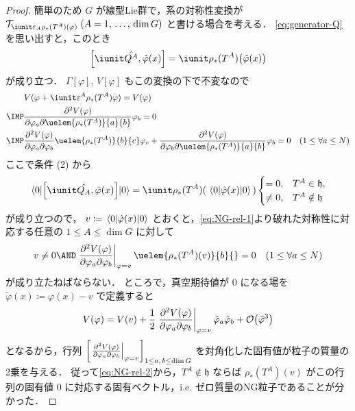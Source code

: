 \documentclass[TQFT_main]{subfiles}
\begin{document}
\begin{proof}
    簡単のため $G$ が線型Lie群で，系の対称性変換が $\mathcal{T}_{\iunit \varepsilon_A \rho_*(T^A)(\varphi)}\; (A = 1,\, \dots,\, \dim G)$ と書ける場合を考える．
    \eqref{eq:generator-Q}を思い出すと，このとき
    \begin{align}
        \comm{\iunit \hat{Q^A}}{\hat{\varphi}(x)} = \iunit \rho_*(T^A)\bigl(\hat{\varphi}(x)\bigr)
    \end{align}
    が成り立つ．    
    $\Gamma[\varphi],\, V[\varphi]$ もこの変換の下で不変なので
    \begin{align}
        &V(\varphi + \iunit \varepsilon^A \rho_*(T^A) \varphi) = V(\varphi) \\
        \IMP &\pdv{V(\varphi)}{\varphi_a} \uelem{\rho_*(T^A)}{a}{b} \varphi_b = 0 \\
        \IMP &\pdv[2]{V(\varphi)}{\varphi_a}{\varphi_b} \uelem{\rho_*(T^A)}{b}{c} \varphi_c + \pdv{V(\varphi)}{\varphi_b} \uelem{\rho_*(T^A)}{a}{b} \varphi_b = 0 \quad (1 \le \forall a \le N) \label{eq:NG-rel-1}
    \end{align}
    ここで条件 (2) から
    \begin{align}
        \mel{0}{\comm{\iunit \hat{Q_A}}{\hat{\varphi}(x)}}{0} = \iunit \rho_*(T^A)(\, \mel{0}{\hat{\varphi}(x)}{0} \,)
        \begin{cases}
            =0, &T^A \in \mathfrak{h},  \\
            \neq 0, &T^A \notin \mathfrak{h}
        \end{cases}
    \end{align}
    が成り立つので，
    $v \coloneqq \mel{0}{\hat{\varphi}(x)}{0}$ とおくと，\eqref{eq:NG-rel-1}より破れた対称性に対応する任意の $1 \le A \le \dim G$ に対して
    \begin{align}
        \label{eq:NG-rel-2}
        v \neq 0 \AND \eval{\pdv[2]{V(\varphi)}{\varphi_a}{\varphi_b}}_{\varphi = v} \uelem{\rho_*(T^A)(v)}{b}{} = 0 \quad (1 \le \forall a \le N)
    \end{align}
    が成り立たねばならない．
    ところで，真空期待値が $0$ になる場を $\tilde{\varphi}(x) \coloneqq \varphi(x) - v$ で定義すると
    \begin{align}
        V(\varphi) = V(v) + \frac{1}{2} \eval{\pdv[2]{V(\varphi)}{\varphi_a}{\varphi_b}}_{\varphi = v} \tilde{\varphi}_a \tilde{\varphi}_b + \order{\tilde{\varphi}^3}
    \end{align}
    となるから，行列 $\left[\eval{\pdv[2]{V(\varphi)}{\varphi_a}{\varphi_b}}_{\varphi = v}\right]_{1 \le a,\, b \le \dim G}$ を対角化した固有値が粒子の質量の2乗を与える．
    従って\eqref{eq:NG-rel-2}から，$T^A \notin \mathfrak{h}$ ならば $\rho_*(T^A)(v)$ がこの行列の固有値 $0$ に対応する固有ベクトル，i.e. ゼロ質量のNG粒子であることが分かった．
\end{proof}
\end{document}
